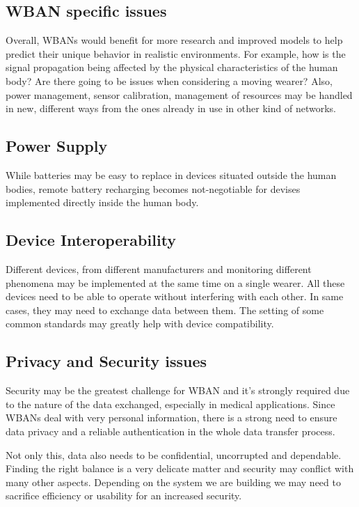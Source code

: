 \documentclass[conference]{IEEEtran}
\begin{document}
\subsection {WBAN specific issues}
Overall, WBANs would benefit for more research and improved models to help predict their unique behavior in realistic environments. For example, how is the signal propagation being affected by the physical characteristics of the human body? Are there going to be issues when considering a moving wearer? Also, power management, sensor calibration, management of resources may be handled in new, different ways from the ones already in use in other kind of networks.

\subsection {Power Supply}
While batteries may be easy to replace in devices situated outside the human bodies, remote battery recharging becomes not-negotiable for devises implemented directly inside the human body.

\subsection {Device Interoperability}
Different devices, from different manufacturers and monitoring different phenomena may be implemented at the same time on a single wearer. All these devices need to be able to operate without interfering with each other. In same cases, they may need to exchange data between them. The setting of some common standards may greatly help with device compatibility. 

\subsection {Privacy and Security issues}
Security may be the greatest challenge for WBAN and it’s strongly required due to the nature of the data exchanged, especially in medical applications. Since WBANs deal with very personal information, there is a strong need to ensure data privacy and a reliable authentication in the whole data transfer process. 

Not only this, data also needs to be confidential, uncorrupted and dependable. Finding the right balance is a very delicate matter and security may conflict with many other aspects. Depending on the system we are building we may need to sacrifice efficiency or usability for an increased security. 
\end{document}
